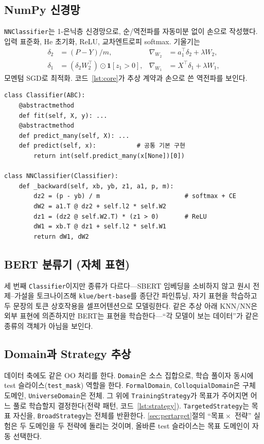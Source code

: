 \documentclass[conference]{IEEEtran}
\begin{document}
\subsection{NumPy 신경망}
\texttt{NNClassifier}는 1-은닉층 신경망으로, 순/역전파를 자동미분 없이 손으로
작성했다. 입력 표준화, He 초기화, ReLU, 교차엔트로피 softmax. 기울기는
\begin{align}
\delta_2 &= (P-Y)/m, & \nabla_{W_2} &= a_1^{\top}\delta_2 + \lambda W_2, \\
\delta_1 &= (\delta_2 W_2^{\top})\odot \mathbf{1}[z_1>0], & \nabla_{W_1} &= X^{\top}\delta_1 + \lambda W_1,
\end{align}
모멘텀 SGD로 최적화. 코드~\ref{lst:core}가 추상 계약과 손으로 쓴 역전파를 보인다.

\begin{lstlisting}[caption={핵심 구현: 추상 \texttt{Classifier} 계약과
\texttt{NNClassifier}의 직접 구현 역전파.}, label={lst:core}]
class Classifier(ABC):
    @abstractmethod
    def fit(self, X, y): ...
    @abstractmethod
    def predict_many(self, X): ...
    def predict(self, x):           # 공통 기본 구현
        return int(self.predict_many(x[None])[0])

class NNClassifier(Classifier):
    def _backward(self, xb, yb, z1, a1, p, m):
        dz2 = (p - yb) / m                       # softmax + CE
        dW2 = a1.T @ dz2 + self.l2 * self.W2
        dz1 = (dz2 @ self.W2.T) * (z1 > 0)       # ReLU
        dW1 = xb.T @ dz1 + self.l2 * self.W1
        return dW1, dW2
\end{lstlisting}

\subsection{BERT 분류기 (자체 표현)}
세 번째 \texttt{Classifier}이지만 종류가 다르다---SBERT 임베딩을 소비하지 않고
원시 전제--가설을 토크나이즈해 \texttt{klue/bert-base}를 종단간 파인튜닝, 자기
표현을 학습하고 두 문장의 토큰 상호작용을 셀프어텐션으로 모델링한다. 같은 추상
아래 KNN/NN은 외부 표현에 의존하지만 BERT는 표현을 학습한다---``각 모델이 보는
데이터''가 같은 종류의 객체가 아님을 보인다.

\subsection{Domain과 Strategy 추상}
\label{sec:domains}
데이터 축에도 같은 OO 처리를 한다. \texttt{Domain}은 소스 집합으로, 학습 풀이자
동시에 test 슬라이스(\texttt{test\_mask}) 역할을 한다. \texttt{FormalDomain},
\texttt{ColloquialDomain}은 구체 도메인, \texttt{UniverseDomain}은 전체. 그 위에
\texttt{TrainingStrategy}가 목표가 주어지면 어느 풀로 학습할지 결정한다(전략
패턴, 코드~\ref{lst:strategy}). \texttt{TargetedStrategy}는 목표 자신을,
\texttt{BroadStrategy}는 전체를 반환한다. \ref{sec:pertarget}절의 ``목표\,$\times$\,
전략'' 실험은 두 도메인을 두 전략에 돌리는 것이며, 올바른 test 슬라이스는 목표
도메인이 자동 선택한다.
\end{document}
